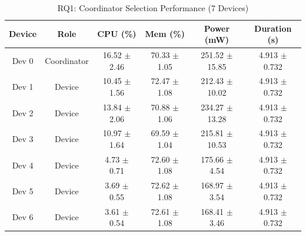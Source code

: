 \begin{table}[htbp]
\centering
\caption{RQ1: Coordinator Selection Performance (7 Devices)}
\label{tab:RQ1-Election-7Nodes-table}
\begin{tabular}{|c|c|c|c|c|c|}
\hline
\textbf{Device} & \textbf{Role} & \textbf{CPU (\%)} & \textbf{Mem (\%)} & \textbf{Power (mW)} & \textbf{Duration (s)} \\
\hline
Dev 0 & Coordinator & 16.52 $\pm$ 2.46 & 70.33 $\pm$ 1.05 & 251.52 $\pm$ 15.85 & 4.913 $\pm$ 0.732 \\
\hline
Dev 1 & Device & 10.45 $\pm$ 1.56 & 72.47 $\pm$ 1.08 & 212.43 $\pm$ 10.02 & 4.913 $\pm$ 0.732 \\
\hline
Dev 2 & Device & 13.84 $\pm$ 2.06 & 70.88 $\pm$ 1.06 & 234.27 $\pm$ 13.28 & 4.913 $\pm$ 0.732 \\
\hline
Dev 3 & Device & 10.97 $\pm$ 1.64 & 69.59 $\pm$ 1.04 & 215.81 $\pm$ 10.53 & 4.913 $\pm$ 0.732 \\
\hline
Dev 4 & Device & 4.73 $\pm$ 0.71 & 72.60 $\pm$ 1.08 & 175.66 $\pm$ 4.54 & 4.913 $\pm$ 0.732 \\
\hline
Dev 5 & Device & 3.69 $\pm$ 0.55 & 72.62 $\pm$ 1.08 & 168.97 $\pm$ 3.54 & 4.913 $\pm$ 0.732 \\
\hline
Dev 6 & Device & 3.61 $\pm$ 0.54 & 72.61 $\pm$ 1.08 & 168.41 $\pm$ 3.46 & 4.913 $\pm$ 0.732 \\
\hline
\end{tabular}
\end{table}
